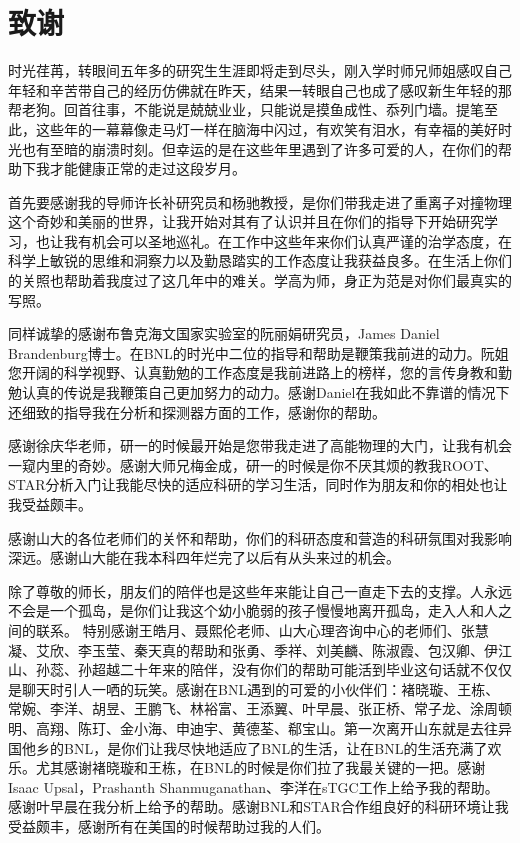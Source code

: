\chapter{致谢}

时光荏苒，转眼间五年多的研究生生涯即将走到尽头，刚入学时师兄师姐感叹自己年轻和辛苦带自己的经历仿佛就在昨天，结果一转眼自己也成了感叹新生年轻的那帮老狗。回首往事，不能说是兢兢业业，只能说是摸鱼成性、忝列门墙。提笔至此，这些年的一幕幕像走马灯一样在脑海中闪过，有欢笑有泪水，有幸福的美好时光也有至暗的崩溃时刻。但幸运的是在这些年里遇到了许多可爱的人，在你们的帮助下我才能健康正常的走过这段岁月。

首先要感谢我的导师许长补研究员和杨驰教授，是你们带我走进了重离子对撞物理这个奇妙和美丽的世界，让我开始对其有了认识并且在你们的指导下开始研究学习，也让我有机会可以圣地巡礼。在工作中这些年来你们认真严谨的治学态度，在科学上敏锐的思维和洞察力以及勤恳踏实的工作态度让我获益良多。在生活上你们的关照也帮助着我度过了这几年中的难关。学高为师，身正为范是对你们最真实的写照。

同样诚挚的感谢布鲁克海文国家实验室的阮丽娟研究员，James Daniel Brandenburg博士。在BNL的时光中二位的指导和帮助是鞭策我前进的动力。阮姐您开阔的科学视野、认真勤勉的工作态度是我前进路上的榜样，您的言传身教和勤勉认真的传说是我鞭策自己更加努力的动力。感谢Daniel在我如此不靠谱的情况下还细致的指导我在分析和探测器方面的工作，感谢你的帮助。

感谢徐庆华老师，研一的时候最开始是您带我走进了高能物理的大门，让我有机会一窥内里的奇妙。感谢大师兄梅金成，研一的时候是你不厌其烦的教我ROOT、STAR分析入门让我能尽快的适应科研的学习生活，同时作为朋友和你的相处也让我受益颇丰。

感谢山大的各位老师们的关怀和帮助，你们的科研态度和营造的科研氛围对我影响深远。感谢山大能在我本科四年烂完了以后有从头来过的机会。

除了尊敬的师长，朋友们的陪伴也是这些年来能让自己一直走下去的支撑。人永远不会是一个孤岛，是你们让我这个幼小脆弱的孩子慢慢地离开孤岛，走入人和人之间的联系。
特别感谢王皓月、聂熙伦老师、山大心理咨询中心的老师们、张慧凝、艾欣、李玉莹、秦天真的帮助和张勇、季祥、刘美麟、陈淑霞、包汉卿、伊江山、孙蕊、孙超越二十年来的陪伴，没有你们的帮助可能活到毕业这句话就不仅仅是聊天时引人一哂的玩笑。感谢在BNL遇到的可爱的小伙伴们：褚晓璇、王栋、常婉、李洋、胡昱、王鹏飞、林裕富、王添翼、叶早晨、张正桥、常子龙、涂周顿明、高翔、陈玎、金小海、申迪宇、黄德荃、郗宝山。第一次离开山东就是去往异国他乡的BNL，是你们让我尽快地适应了BNL的生活，让在BNL的生活充满了欢乐。尤其感谢褚晓璇和王栋，在BNL的时候是你们拉了我最关键的一把。感谢Isaac Upsal，Prashanth Shanmuganathan、李洋在sTGC工作上给予我的帮助。感谢叶早晨在我分析上给予的帮助。感谢BNL和STAR合作组良好的科研环境让我受益颇丰，感谢所有在美国的时候帮助过我的人们。

